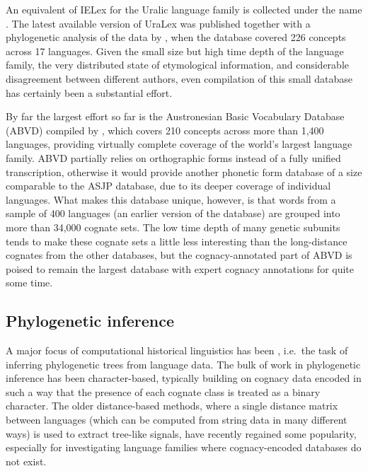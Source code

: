 An equivalent of IELex for the Uralic language family is collected under the name . The latest available version of UraLex was published together with a phylogenetic analysis of the data by \citet{syrjanen_ea_2013}, when the database covered 226 concepts across 17 languages. Given the small size but high time depth of the language family, the very distributed state of etymological information, and considerable disagreement between different authors, even compilation of this small database has certainly been a substantial effort.

By far the largest effort so far is the Austronesian Basic Vocabulary Database (ABVD) compiled by \citet{greenhill_ea_2008}, which covers 210 concepts across more than 1,400 languages, providing virtually complete coverage of the world's largest language family. ABVD partially relies on orthographic forms instead of a fully unified transcription, otherwise it would provide another phonetic form database of a size comparable to the ASJP database, due to its deeper coverage of individual languages. What makes this database unique, however, is that words from a sample of 400 languages (an earlier version of the database) are grouped into more than 34,000 cognate sets. The low time depth of many genetic subunits tends to make these cognate sets a little less interesting than the long-distance cognates from the other databases, but the cognacy-annotated part of ABVD is poised to remain the largest database with expert cognacy annotations for quite some time.

\subsection{Phylogenetic inference}\label{sec:2.5.2}
A major focus of computational historical linguistics has been , i.e.\ the task of inferring phylogenetic trees from language data. The bulk of work in phylogenetic inference has been character-based, typically building on cognacy data encoded in such a way that the presence of each cognate class is treated as a binary character. The older distance-based methods, where a single distance matrix between languages (which can be computed from string data in many different ways) is used to extract tree-like signals, have recently regained some popularity, especially for investigating language families where cognacy-encoded databases do not exist.

